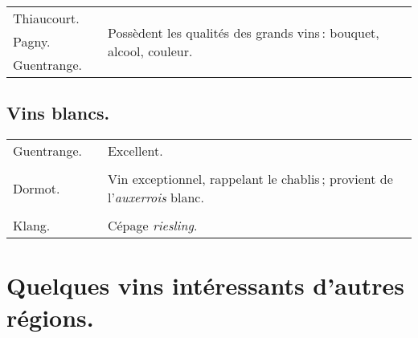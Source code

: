 \scriptsize
\begin{longtable}{m{10em}m{12em}m{12em}}                                                    
  Thiaucourt.              &                        & \multirow{3}{12em}{Possèdent les qualités des grands vins :
                                                      bouquet, alcool, couleur.}                                       \\
  Pagny.                   &                        &                                                                  \\
  Guentrange.              &                        &                                                                  \\
\end{longtable}
\normalsize

\subsection*{\centering \small\sc Vins blancs.}

\scriptsize
\begin{longtable}{m{10em}m{12em}m{12em}}                                                       
  Guentrange.              &                        & Excellent.                                                       \\
                           &                        &                                                                  \\
  Dormot.                  &                        & Vin exceptionnel, rappelant le chablis ; provient de 
                                                      l'\textit{auxerrois} blanc.                                      \\
                           &                        &                                                                  \\
  Klang.                   &                        & Cépage \textit{riesling}.                                        \\
\end{longtable}
\normalsize

\section*{\centering Quelques vins intéressants d'autres régions.}

